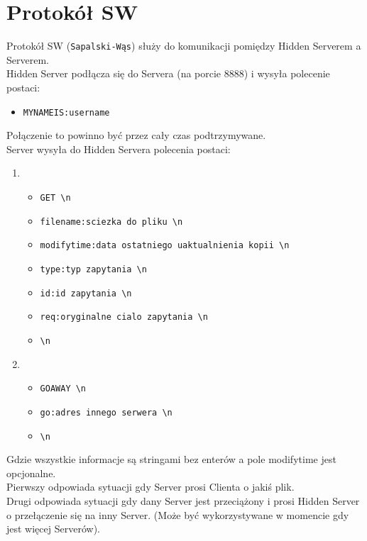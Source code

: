 \documentclass[a4paper,notitlepage]{article}
\begin{document}
\pagestyle{fancy}
\tableofcontents
\section{Protokół SW}
Protokół SW (\texttt{Sapalski-Wąs}) służy do komunikacji pomiędzy Hidden Serverem a Serverem. \\
Hidden Server podłącza się do Servera (na porcie 8888) i wysyła polecenie postaci:
\begin{itemize}
    \item \texttt{MYNAMEIS:username}
\end{itemize}
Połączenie to powinno być przez cały czas podtrzymywane.\\

Server wysyła do Hidden Servera polecenia postaci:
\begin{enumerate}
    \item
\begin{itemize}
    \item \texttt{GET \textbackslash n}
    \item \texttt{filename:sciezka do pliku \textbackslash n}
    \item \texttt{modifytime:data ostatniego uaktualnienia kopii \textbackslash n}
    \item \texttt{type:typ zapytania \textbackslash n}
    \item \texttt{id:id zapytania \textbackslash n}
    \item \texttt{req:oryginalne cialo zapytania \textbackslash n}
    \item \texttt{\textbackslash n}
\end{itemize}
    \item
\begin{itemize}    
    \item \texttt{GOAWAY \textbackslash n}
    \item \texttt{go:adres innego serwera \textbackslash n}
    \item \texttt{\textbackslash n}
\end{itemize}
\end{enumerate}
Gdzie wszystkie informacje są stringami bez enterów a pole modifytime jest opcjonalne. \\
Pierwszy odpowiada sytuacji gdy Server prosi Clienta o jakiś plik.\\ 
Drugi odpowiada sytuacji gdy dany Server jest przeciążony i prosi Hidden Server o przełączenie się na inny Server. (Może być wykorzystywane w momencie gdy jest więcej Serverów).\\
\end{document}
